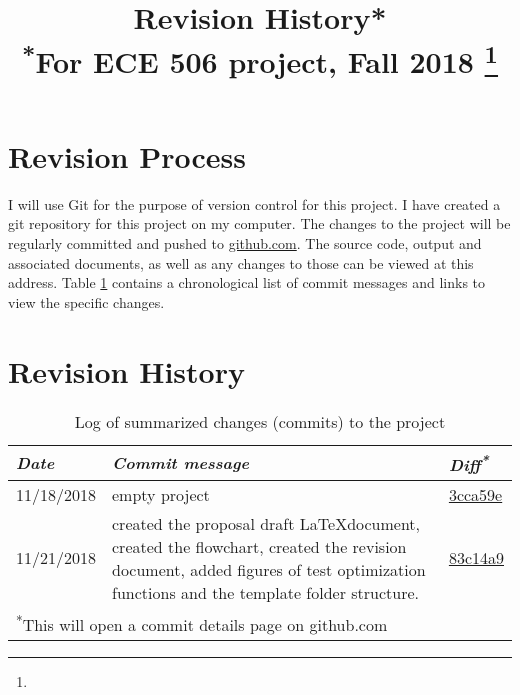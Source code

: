 \documentclass[conference]{IEEEtran}
\begin{document}
\title{Revision History*\\
{\footnotesize \textsuperscript{*}For ECE 506 project, Fall 2018}
\thanks{}
}

\author{
}

\onecolumn

\maketitle

\section{Revision Process}
I will use Git for the purpose of version control for this project. I have created a git repository for this project on my computer. The changes to the project will be regularly committed and pushed to \href{https://github.com/esalman/optimization_project/}{github.com}. The source code, output and associated documents, as well as any changes to those can be viewed at this address. Table \ref{tab1} contains a chronological list of commit messages and links to view the specific changes.

\section{Revision History}

\begin{table}[htbp]
\caption{Log of summarized changes (commits) to the project}
\begin{center}
\begin{tabular}{|p{2cm}|p{12cm}|p{1.5cm}|}
\hline
\textbf{\textit{Date}} & \textbf{\textit{Commit message}} & \textbf{\textit{Diff\textsuperscript{*}}} \\
\hline
11/18/2018 & empty project & \href{https://github.com/esalman/optimization_project/commit/3cca59ef96b87e23606e25f05718cc9657fb858e}{3cca59e} \\
\hline
11/21/2018 & created the proposal draft \LaTeX document, created the flowchart, created the revision document, added figures of test optimization functions and the template folder structure. & \href{https://github.com/esalman/optimization_project/commit/83c14a986cda7649bbc1ff77555dc8fd7c02e4c4}{83c14a9} \\
\hline
\multicolumn{3}{l}{\textsuperscript{*}This will open a commit details page on github.com}
\end{tabular}
\label{tab1}
\end{center}
\end{table}
\end{document}
